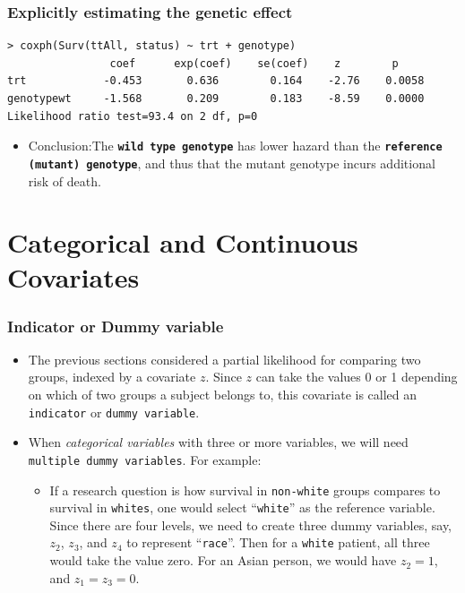 \documentclass{beamer}
\newcommand{\empr}[1]{{\emph{\color{red}#1}}}
\newcommand{\pkg}[1]{{\textbf{\texttt{#1}}}}
\begin{document}
\pagebreak
\begin{frame}[fragile]
\frametitle{Explicitly estimating the genetic effect}
\begin{Verbatim}
> coxph(Surv(ttAll, status) ~ trt + genotype)
                coef      exp(coef)    se(coef)    z        p 
trt            -0.453       0.636        0.164    -2.76    0.0058
genotypewt     -1.568       0.209        0.183    -8.59    0.0000
Likelihood ratio test=93.4 on 2 df, p=0
\end{Verbatim}
\begin{itemize}
\item Conclusion:The \pkg{wild type genotype} has lower hazard than the \pkg{reference (mutant) genotype}, and thus that the mutant genotype incurs additional risk of death.
\end{itemize} 
\end{frame}


\section{Categorical and Continuous Covariates}
\begin{frame}
\frametitle{Indicator or Dummy variable}
\begin{itemize}
\item The previous sections considered a partial likelihood for comparing two groups, indexed by a covariate $z$. Since $z$ can take the values 0 or 1 depending on which of two groups a subject belongs to, this covariate is called an \texttt{indicator} or \texttt{dummy variable}.
\item When \empr{categorical variables} with three or more variables, we will need \texttt{multiple dummy variables}. For example:
\begin{itemize}
\item If a research question is how survival in \texttt{non-white} groups compares to survival in \texttt{whites}, one would select ``\texttt{white}'' as the reference variable. Since there are four levels, we need to create {\color{red}three} dummy variables, say, $z_2$, $z_3$, and $z_4$ to represent ``\texttt{race}''. Then for a \texttt{white} patient, all three would take the value zero. For an Asian person, we would have $z_2=1$, and $z_1=z_3=0$.
\end{itemize}
\end{itemize}
\end{frame}
\end{document}
